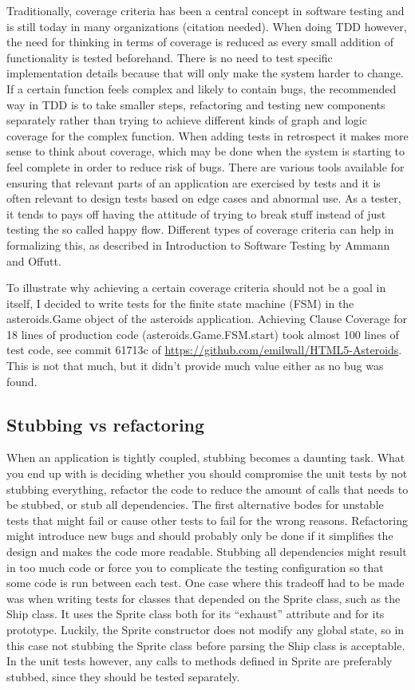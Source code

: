 \documentclass[11pt]{article}
\begin{document}
Traditionally, coverage criteria has been a central concept in software testing and is still today in many organizations (citation needed). When doing TDD however, the need for thinking in terms of coverage is reduced as every small addition of functionality is tested beforehand. There is no need to test specific implementation details because that will only make the system harder to change. If a certain function feels complex and likely to contain bugs, the recommended way in TDD is to take smaller steps, refactoring and testing new components separately rather than trying to achieve different kinds of graph and logic coverage for the complex function. When adding tests in retrospect it makes more sense to think about coverage, which may be done when the system is starting to feel complete in order to reduce risk of bugs. There are various tools available for ensuring that relevant parts of an application are exercised by tests and it is often relevant to design tests based on edge cases and abnormal use. As a tester, it tends to pays off having the attitude of trying to break stuff instead of just testing the so called happy flow. Different types of coverage criteria can help in formalizing this, as described in Introduction to Software Testing by Ammann and Offutt\cite{AmmannOffutt}.

To illustrate why achieving a certain coverage criteria should not be a goal in itself, I decided to write tests for the finite state machine (FSM) in the asteroids.Game object of the asteroids application. Achieving Clause Coverage\cite[p.~106]{AmmannOffutt} for 18 lines of production code (asteroids.Game.FSM.start) took almost 100 lines of test code, see commit 61713c of \url{https://github.com/emilwall/HTML5-Asteroids}. This is not that much, but it didn't provide much value either as no bug was found.

\subsection{Stubbing vs refactoring}

When an application is tightly coupled, stubbing becomes a daunting task. What you end up with is deciding whether you should compromise the unit tests by not stubbing everything, refactor the code to reduce the amount of calls that needs to be stubbed, or stub all dependencies. The first alternative bodes for unstable tests that might fail or cause other tests to fail for the wrong reasons. Refactoring might introduce new bugs and should probably only be done if it simplifies the design and makes the code more readable. Stubbing all dependencies might result in too much code or force you to complicate the testing configuration so that some code is run between each test. One case where this tradeoff had to be made was when writing tests for classes that depended on the Sprite class, such as the Ship class. It uses the Sprite class both for its ``exhaust'' attribute and for its prototype. Luckily, the Sprite constructor does not modify any global state, so in this case not stubbing the Sprite class before parsing the Ship class is acceptable. In the unit tests however, any calls to methods defined in Sprite are preferably stubbed, since they should be tested separately.
\end{document}
